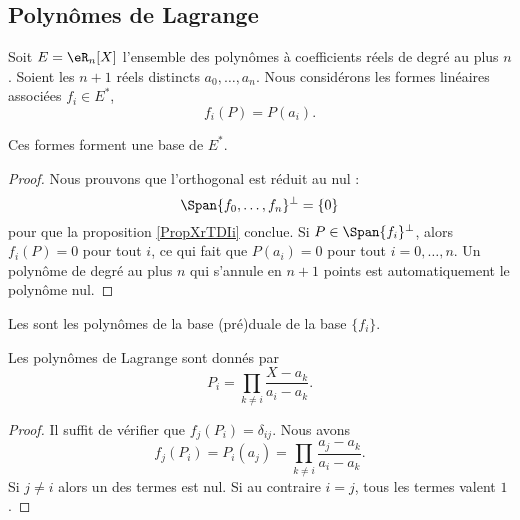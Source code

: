 \subsection{Polynômes de Lagrange}

Soit \( E=\eR_n[X]\) l'ensemble des polynômes à coefficients réels de degré au plus \( n\). Soient les \( n+1\) réels distincts \( a_0,\ldots, a_n\). Nous considérons les formes linéaires associées \( f_i\in E^*\),
\begin{equation}
    f_i(P)=P(a_i).
\end{equation}
\begin{lemma}
    Ces formes forment une base de \( E^*\).
\end{lemma}

\begin{proof}
    Nous prouvons que l'orthogonal est réduit au nul :
    \begin{equation}
        \Span\{ f_0,\ldots, f_n \}^{\perp}=\{ 0 \}
    \end{equation}
    pour que la proposition \ref{PropXrTDIi} conclue. Si \( P\in\Span\{ f_i \}^{\perp}\), alors \( f_i(P)=0\) pour tout \( i\), ce qui fait que \( P(a_i)=0\) pour tout \( i=0,\ldots, n\). Un polynôme de degré au plus \( n\) qui s'annule en \( n+1\) points est automatiquement le polynôme nul.
\end{proof}

Les  sont les polynômes de la base (pré)duale de la base \( \{ f_i \}\).

\begin{proposition}
    Les polynômes de Lagrange sont donnés par
    \begin{equation}
        P_i=\prod_{k\neq i}\frac{ X-a_k }{ a_i-a_k }.
    \end{equation}
\end{proposition}

\begin{proof}
    Il suffit de vérifier que \( f_j(P_i)=\delta_{ij}\). Nous avons
    \begin{equation}
        f_j(P_i)=P_i(a_j)=\prod_{k\neq i}\frac{ a_j-a_k }{ a_i-a_k }.
    \end{equation}
    Si \( j\neq i\) alors un des termes est nul. Si au contraire \( i=j\), tous les termes valent \( 1\).
\end{proof}

